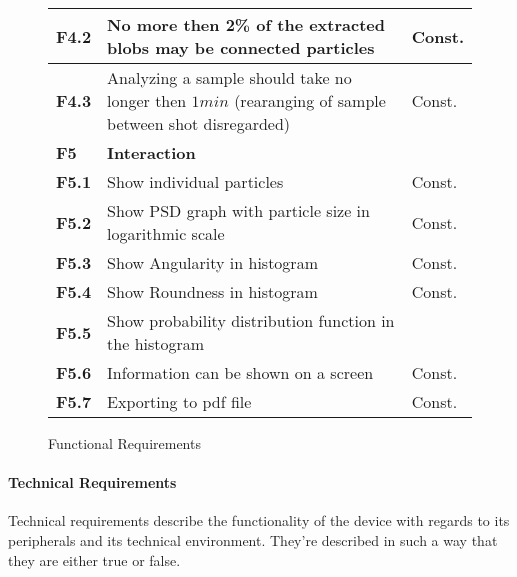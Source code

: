 \documentclass[11pt,fleqn,,a4paper,twoside,openright]{book}
\begin{document}
\begin{figure}[h]
\begin{tabular}{|p{1cm}| p{10cm} p{1.5cm}|}
		\hline \textbf{F4.2}\label{F4.2} & No more then 2\% of the extracted blobs may be connected particles & Const. \\ 
		\hline \textbf{F4.3}\label{F4.3} & Analyzing a sample should take no longer then $ 1 min$ (rearanging of sample between shot disregarded) & Const. \\
		\rowcolor{bananamania}
		\hline \textbf{F5}\label{F5} & \textbf{Interaction} &  \\ 
		\hline \textbf{F5.1}\label{F5.1} & Show individual particles  & Const. \\ 
		\hline \textbf{F5.2}\label{F5.2} & Show PSD graph with particle size in logarithmic scale  & Const.  \\ 
		\hline \textbf{F5.3}\label{F5.3} & Show Angularity in histogram  & Const. \\ 
		\hline \textbf{F5.4}\label{F5.4} & Show Roundness in histogram & Const. \\ 
		\hline \textbf{F5.5}\label{F5.5} & Show probability distribution function in the histogram &  \\ 
		\hline \textbf{F5.6}\label{F5.6} & Information can be shown on a screen & Const. \\
		\hline \textbf{F5.7}\label{F5.7} & Exporting to pdf file & Const. \\
	\end{tabular} 
	\caption{Functional Requirements}\label{Functional Requirements}
\end{figure}

\paragraph{Technical Requirements}
Technical requirements describe the functionality of the device with regards to its peripherals and its technical environment. They're described in such a way that they are either true or false.
\end{document}
